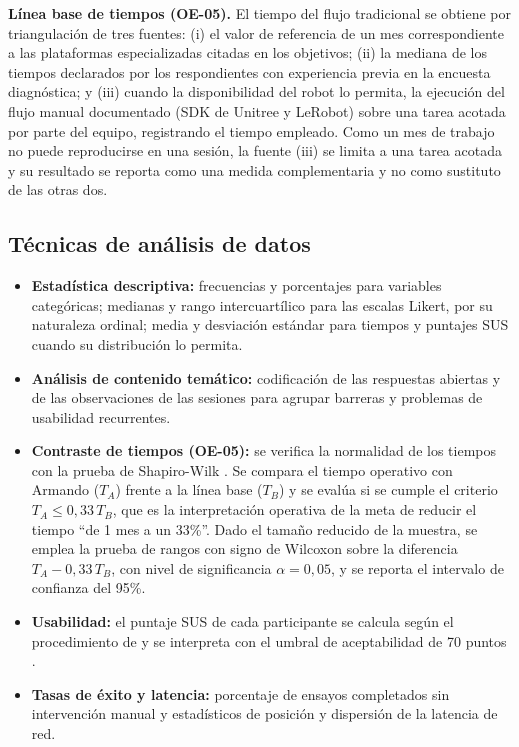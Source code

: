 \documentclass[stu,12pt,floatsintext]{apa7}
\begin{document}
\textbf{Línea base de tiempos (OE-05).} El tiempo del flujo tradicional se obtiene por triangulación de tres fuentes: (i) el valor de referencia de un mes correspondiente a las plataformas especializadas citadas en los objetivos; (ii) la mediana de los tiempos declarados por los respondientes con experiencia previa en la encuesta diagnóstica; y (iii) cuando la disponibilidad del robot lo permita, la ejecución del flujo manual documentado (SDK de Unitree y LeRobot) sobre una tarea acotada por parte del equipo, registrando el tiempo empleado. Como un mes de trabajo no puede reproducirse en una sesión, la fuente (iii) se limita a una tarea acotada y su resultado se reporta como una medida complementaria y no como sustituto de las otras dos.

\subsection{Técnicas de análisis de datos}

\begin{itemize}
    \item \textbf{Estadística descriptiva:} frecuencias y porcentajes para variables categóricas; medianas y rango intercuartílico para las escalas Likert, por su naturaleza ordinal; media y desviación estándar para tiempos y puntajes SUS cuando su distribución lo permita.
    \item \textbf{Análisis de contenido temático:} codificación de las respuestas abiertas y de las observaciones de las sesiones para agrupar barreras y problemas de usabilidad recurrentes.
    \item \textbf{Contraste de tiempos (OE-05):} se verifica la normalidad de los tiempos con la prueba de Shapiro-Wilk \parencite{shapiro1965analysis}. Se compara el tiempo operativo con Armando ($T_{A}$) frente a la línea base ($T_{B}$) y se evalúa si se cumple el criterio $T_{A} \leq 0{,}33\,T_{B}$, que es la interpretación operativa de la meta de reducir el tiempo ``de 1 mes a un 33\%''. Dado el tamaño reducido de la muestra, se emplea la prueba de rangos con signo de Wilcoxon \parencite{wilcoxon1945individual} sobre la diferencia $T_{A} - 0{,}33\,T_{B}$, con nivel de significancia $\alpha = 0{,}05$, y se reporta el intervalo de confianza del 95\%.
    \item \textbf{Usabilidad:} el puntaje SUS de cada participante se calcula según el procedimiento de \textcite{brooke1996sus} y se interpreta con el umbral de aceptabilidad de 70 puntos \parencite{bangor2008empirical}.
    \item \textbf{Tasas de éxito y latencia:} porcentaje de ensayos completados sin intervención manual y estadísticos de posición y dispersión de la latencia de red.
\end{itemize}
\end{document}
